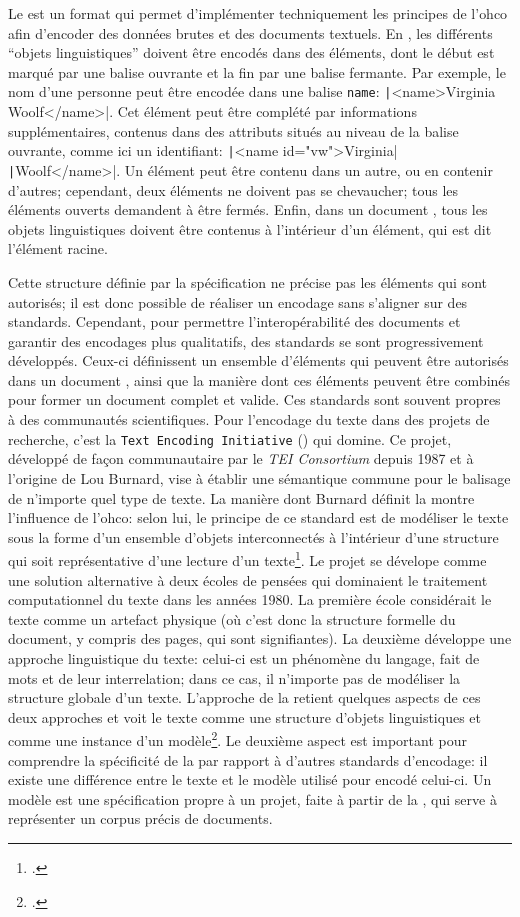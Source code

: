 Le \xml{} est un format qui permet d'implémenter techniquement les principes de l'\gls{ohco} afin d'encoder des données brutes et des documents textuels. En \xml{}, les différents \enquote{objets linguistiques} doivent être encodés dans des éléments, dont le début est marqué par une balise ouvrante et la fin par une balise fermante. Par exemple, le nom d'une personne peut être encodée dans une balise \texttt{name}: \texttt|<name>Virginia Woolf</name>|. Cet élément peut être complété par informations supplémentaires, contenus dans des attributs situés au niveau de la balise ouvrante, comme ici un identifiant: \texttt|<name id="vw">Virginia| \texttt|Woolf</name>|. Un élément peut être contenu dans un autre, ou en contenir d'autres; cependant, deux éléments ne doivent pas se chevaucher; tous les éléments ouverts demandent à être fermés. Enfin, dans un document \xml{}, tous les objets linguistiques doivent être contenus à l'intérieur d'un élément, qui est dit l'élément racine.

Cette structure définie par la spécification \xml{} ne précise pas les éléments qui sont autorisés; il est donc possible de réaliser un encodage sans s'aligner sur des standards. Cependant, pour permettre l'interopérabilité des documents et garantir des encodages plus qualitatifs, des standards se sont progressivement développés. Ceux-ci définissent un ensemble d'éléments qui peuvent être autorisés dans un document \xml{}, ainsi que la manière dont ces éléments peuvent être combinés pour former un document complet et valide. Ces standards sont souvent propres à des communautés scientifiques. Pour l'encodage du texte dans des projets de recherche, c'est la \texttt{Text Encoding Initiative} (\tei{}) qui domine. Ce projet, développé de façon communautaire par le \textit{TEI Consortium} depuis 1987 et à l'origine de Lou Burnard, vise à établir une sémantique commune pour le balisage de n'importe quel type de texte. La manière dont Burnard définit la \tei{} montre l'influence de l'\gls{ohco}: selon lui, le principe de ce standard est de modéliser le texte sous la forme d'un ensemble d'objets interconnectés à l'intérieur d'une structure qui soit représentative d'une lecture d'un texte\footcite[p. 108]{burnard_how_2019}. Le projet se dévelope comme une solution alternative à deux écoles de pensées qui dominaient le traitement computationnel du texte dans les années 1980. La première école considérait le texte comme un artefact physique (où c'est donc la structure formelle du document, y compris des pages, qui sont signifiantes). La deuxième développe une approche linguistique du texte: celui-ci est un phénomène du langage, fait de mots et de leur interrelation; dans ce cas, il n'importe pas de modéliser la structure globale d'un texte. L'approche de la \tei{} retient quelques aspects de ces deux approches et voit le texte comme une structure d'objets linguistiques et comme une instance d'un modèle\footcite[§3]{burnard_search_2021}. Le deuxième aspect est important pour comprendre la spécificité de la \tei{} par rapport à d'autres standards d'encodage: il existe une différence entre le texte et le modèle utilisé pour encodé celui-ci. Un modèle est une spécification propre à un projet, faite à partir de la \tei{}, qui serve à représenter un corpus précis de documents. 

